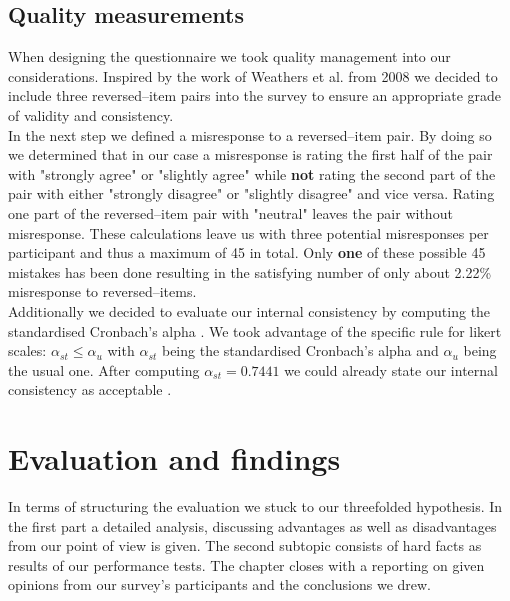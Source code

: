 \documentclass[runningheads]{llncs}
\begin{document}
\subsection{Quality measurements}
When designing the questionnaire we took quality management into our considerations. Inspired by the work of Weathers et al. from 2008 \cite{SwWN08} we decided to include three reversed--item pairs into the survey to ensure an appropriate grade of validity and consistency. \\
In the next step we defined a misresponse to a reversed--item pair. By doing so we determined that in our case a misresponse is rating the first half of the pair with "strongly agree" or "slightly agree" while \textbf{not} rating the second part of the pair with either "strongly disagree" or "slightly disagree" and vice versa. Rating one part of the reversed--item pair with "neutral" leaves the pair without misresponse. These calculations leave us with three potential misresponses per participant and thus a maximum of 45 in total. Only \textbf{one} of these possible 45 mistakes has been done resulting in the satisfying number of only about 2.22\% misresponse to reversed--items. \\
Additionally we decided to evaluate our internal consistency by computing the standardised Cronbach's alpha \cite{TaDe11}. We took advantage of the specific rule for likert scales: $\alpha_{st} \le \alpha_u$ with $\alpha_{st}$ being the standardised Cronbach's alpha and $\alpha_u$ being the usual one. After computing $\alpha_{st} = 0.7441$ we could already state our internal consistency as acceptable \cite{Geor03}. \\
\section{Evaluation and findings}
In terms of structuring the evaluation we stuck to our threefolded hypothesis. In the first part a detailed analysis, discussing advantages as well as disadvantages from our point of view is given. The second subtopic consists of hard facts as results of our performance tests. The chapter closes with a reporting on given opinions from our survey's participants and the conclusions we drew.
\end{document}
